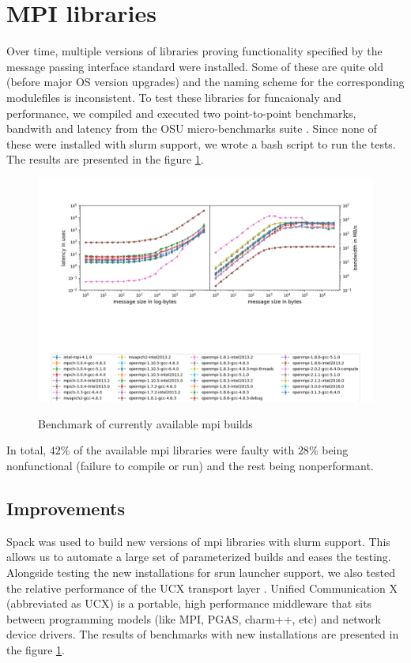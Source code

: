 \documentclass[sigconf,authordraft]{acmart}
\begin{document}
\section{MPI libraries}
Over time, multiple versions of libraries proving functionality specified by the message passing interface standard \cite{mpi_3_1,mpi_2_2} were installed. Some of these are quite old (before major OS version upgrades) and the naming scheme for the corresponding modulefiles is inconsistent. To test these libraries for funcaionaly and performance, we compiled and executed two point-to-point benchmarks, bandwith and latency from the OSU micro-benchmarks suite \cite{osu_bench_website}. Since none of these were installed with slurm support, we wrote a bash script to run the tests. The results are presented in the figure \ref{fig:currmpi}.

\begin{figure}[h]
	\centering
	\includegraphics[width=\linewidth]{curr_mpi_combined}
	\caption{Benchmark of currently available mpi builds}
		  \label{fig:currmpi}
\end{figure}

In total, $42\%$ of the available mpi libraries were faulty with $28\%$ being nonfunctional (failure to compile or run) and the rest being nonperformant.

\subsection{Improvements}
 
Spack\cite{spack} was used to build new versions of mpi libraries with slurm support. This allows us to automate a large set of parameterized builds and eases the testing. Alongside testing the new installations for srun launcher support, we also tested the relative performance of the UCX transport layer \cite{shamis2015ucx,openucx-website}. Unified Communication X (abbreviated as UCX) is a portable, high performance middleware that sits between programming models (like MPI, PGAS, charm++, etc) and network device drivers. The results of benchmarks with new installations are presented in the figure \ref{fig:currmpi}. 
\end{document}
